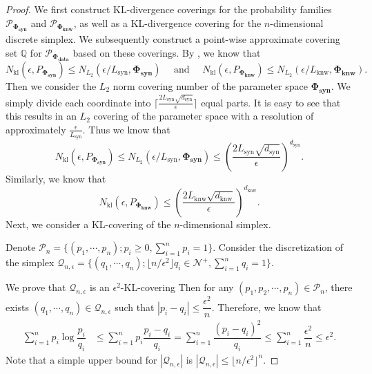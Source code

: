 \documentclass[11pt]{article}
\theoremstyle{plain}
\theoremstyle{definition}
\newcommand{\knwfamily}{\mathbf{\Phi_{\text{knw}}}}
\newcommand{\synfamily}{\mathbf{\Phi_{\text{syn}}}}
\newcommand{\knwprobability}{\mathcal{P}_{\boldsymbol{\Phi_{\text{knw}}}}}
\newcommand{\synprobability}{\mathcal{P}_{\boldsymbol{\Phi_{\text{syn}}}}}
\newcommand{\dataprobability}{\mathcal{P}_{\boldsymbol{\Phi_{\text{data}}}}}
\newcommand{\knwdimension}{d_{\text{knw}}}
\newcommand{\syndimension}{d_{\text{syn}}}
\newcommand{\knwLip}{L_{\text{knw}}}
\newcommand{\synLip}{L_{\text{syn}}}
\newcommand{\syncover}{n_{\text{syn}}}
\newcommand{\knwcover}{n_{\text{knw}}}
\begin{document}
\begin{proof}
We first construct KL-divergence coverings for the probability families $\synprobability$ and $\knwprobability$, as well as a KL-divergence covering for the $n$-dimensional discrete simplex. We subsequently construct a point-wise approximate covering set $\mathbb{Q}$ for $\dataprobability$ based on these coverings.
By , we know that 
$$
N_{\text{kl}}(\epsilon, P_{\synfamily})\le N_{L_2}(\epsilon/\synLip, \synfamily) \quad \text{ and }\quad 
N_{\text{kl}}(\epsilon, P_{\knwfamily})\le N_{L_2}(\epsilon/\knwLip, \knwfamily).
$$
Then we consider the $L_2$ norm covering number of the parameter space $\synfamily$. 
We simply divide each coordinate into \( \lceil \frac{2\synLip\sqrt{\syndimension}}{ \epsilon} \rceil \) equal parts. It is easy to see that this results in an \( L_2 \) covering of the parameter space with a resolution of approximately \( \frac{\epsilon}{\synLip} \).
 Thus we know that 
\[
N_{\text{kl}}(\epsilon, P_{\boldsymbol{\synfamily}})\le N_{L_2}(\epsilon/\synLip, \synfamily)\le \left( \dfrac{2\synLip\sqrt{\syndimension}}{\epsilon} \right) ^{\syndimension}.
\]
Similarly, we know that 
\[
N_{\text{kl}}(\epsilon, P_{\boldsymbol{\knwfamily}})\le \left( \dfrac{2\knwLip\sqrt{\knwdimension}}{\epsilon} \right) ^{\knwdimension}.
\]
Next, we consider a KL-covering of the \( n \)-dimensional simplex.

Denote $\mathcal{P}_n=\{(p_1,\cdots,p_n);p_i\ge 0 ,\sum\limits_{i=1}^np_i=1\}$.
Consider the discretization of the simplex $\mathcal{Q}_{n,\epsilon}=\{(q_1,\cdots,q_n); \lfloor n/\epsilon^2 \rfloor q_i  \in \mathcal{N}^+,\sum\limits_{i=1}^n q_i=1\}$. 

We prove that $\mathcal{Q}_{n,\epsilon}$ is an $\epsilon^2$-KL-covering 
Then for any $(p_1,p_2,\cdots,p_n)\in \mathcal{P}_n$, there exists $(q_1,\cdots,q_n)\in \mathcal{Q}_{n,\epsilon}$ such that $|p_i-q_i|\le \dfrac{\epsilon^2}{n}$.
Therefore, we know that \begin{align*}
    \sum\limits_{i=1}^n p_i\log \dfrac{p_i}{q_i}&\le \sum\limits_{i=1}^n p_i\dfrac{p_i-q_i}{q_i}
   =\sum\limits_{i=1}^n \dfrac{(p_i-q_i)^2}{q_i}
    \le \sum\limits_{i=1}^n \dfrac{\epsilon^2}{n} \le \epsilon^2.
\end{align*}
Note that a simple upper bound for $|\mathcal{Q}_{n,\epsilon}|$ is $|\mathcal{Q}_{n,\epsilon}|\le \lfloor n/\epsilon^2\rfloor^n$.


\end{proof}
\end{document}
